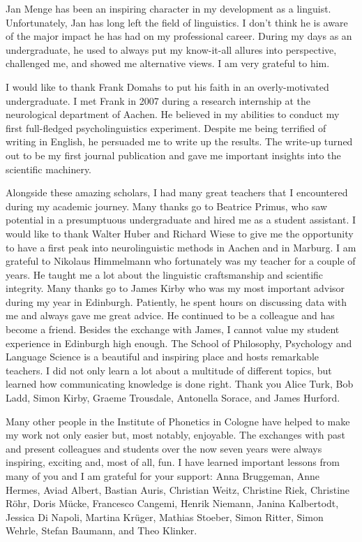 Jan Menge has been an inspiring character in my development as a linguist. Unfortunately, Jan has long left the field of linguistics. I don’t think he is aware of the major impact he has had on my professional career. During my days as an undergraduate, he used to always put my know-it-all allures into perspective, challenged me, and showed me alternative views. I am very grateful to him.

I would like to thank Frank Domahs to put his faith in an overly-motivated undergraduate. I met Frank in 2007 during a research internship at the neurological department of Aachen. He believed in my abilities to conduct my first full-fledged psycholinguistics experiment. Despite me being terrified of writing in English, he persuaded me to write up the results. The write-up turned out to be my first journal publication and gave me important insights into the scientific machinery.

Alongside these amazing scholars, I had many great teachers that I encountered during my academic journey. Many thanks go to Beatrice Primus, who saw potential in a presumptuous undergraduate and hired me as a student assistant. I would like to thank Walter Huber and Richard Wiese to give me the opportunity to have a first peak into neurolinguistic methods in Aachen and in Marburg. I am grateful to Nikolaus Himmelmann who fortunately was my teacher for a couple of years. He taught me a lot about the linguistic craftsmanship and scientific integrity. Many thanks go to James Kirby who was my most important advisor during my year in Edinburgh. Patiently, he spent hours on discussing data with me and always gave me great advice. He continued to be a colleague and has become a friend. Besides the exchange with James, I cannot value my student experience in Edinburgh high enough. The School of Philosophy, Psychology and Language Science is a beautiful and inspiring place and hosts remarkable teachers. I did not only learn a lot about a multitude of different topics, but learned how communicating knowledge is done right. Thank you Alice Turk, Bob Ladd, Simon Kirby, Graeme Trousdale, Antonella Sorace, and James Hurford.

\newpage
Many other people in the Institute of Phonetics in Cologne have helped to make my work not only easier but, most notably, enjoyable. The exchanges with past and present colleagues and students over the now seven years were always inspiring, exciting and, most of all, fun. I have learned important lessons from many of you and I am grateful for your support: Anna Bruggeman, Anne Hermes, Aviad Albert, Bastian Auris, Christian Weitz, Christine Riek, Christine Röhr, Doris Mücke, Francesco Cangemi, Henrik Niemann, Janina Kalbertodt, Jessica Di Napoli, Martina Krüger, Mathias Stoeber, Simon Ritter, Simon Wehrle, Stefan Baumann, and Theo Klinker.


